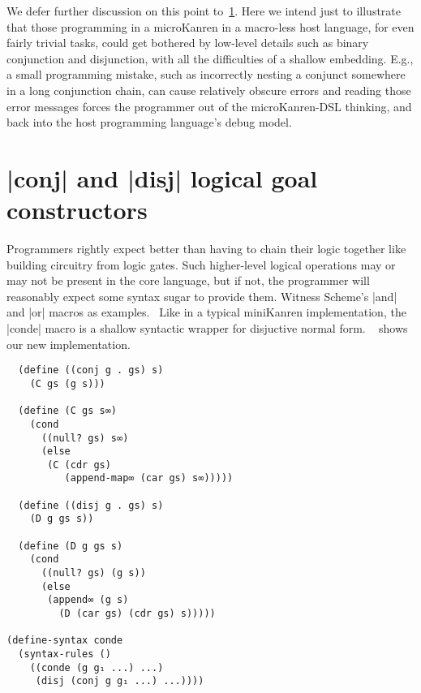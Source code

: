\documentclass[sigplan,screen,draft,anonymous,review,natbib=false]{acmart}
\begin{document}
We defer further discussion on this point to~\cref{sec:conde}. Here we
intend just to illustrate that those programming in a microKanren in a
macro-less host language, for even fairly trivial tasks, could get
bothered by low-level details such as binary conjunction and
disjunction, with all the difficulties of a shallow embedding. E.g., a
small programming mistake, such as incorrectly nesting a conjunct
somewhere in a long conjunction chain, can cause relatively obscure
errors and reading those error messages forces the programmer out of
the microKanren-DSL thinking, and back into the host programming
language's debug model.

\section{\rackinline|conj| and \rackinline|disj| logical goal
  constructors}\label{sec:conde}

Programmers rightly expect better than having to chain their logic
together like building circuitry from logic gates. Such higher-level
logical operations may or may not be present in the core language, but
if not, the programmer will reasonably expect some syntax sugar to
provide them. Witness Scheme's \rackinline|and| and
\rackinline|or| macros as examples.~\cite{shinn2013revisedreport} Like
in a typical miniKanren implementation, the \rackinline|conde| macro
is a shallow syntactic wrapper for disjuctive normal form.
~ shows our new
implementation.

\begin{listing}
  \begin{verbatim}
  (define ((conj g . gs) s)
    (C gs (g s)))

  (define (C gs s∞)
    (cond
      ((null? gs) s∞)
      (else
       (C (cdr gs)
          (append-map∞ (car gs) s∞)))))

  (define ((disj g . gs) s)
    (D g gs s))

  (define (D g gs s)
    (cond
      ((null? gs) (g s))
      (else
       (append∞ (g s)
         (D (car gs) (cdr gs) s)))))

(define-syntax conde
  (syntax-rules ()
    ((conde (g g₁ ...) ...)
     (disj (conj g g₁ ...) ...))))
  \end{verbatim}
  \caption{Re-implementations of \rackinline|conj| and \rackinline|disj|.}
  \label{mnt:conj-and-disj-reimplementation}
\end{listing}
\end{document}
